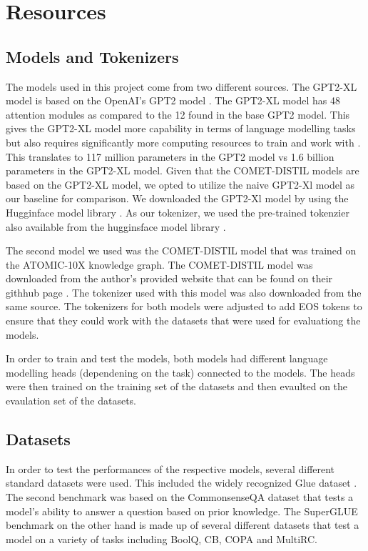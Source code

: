 \documentclass[\main/thesis.tex]{subfiles}
\begin{document}
\chapter{Resources}\label{sec:resources} 


\section{Models and Tokenizers}\label{sec:models}
The models used in this project come from two different sources. The GPT2-XL model is based on the OpenAI's GPT2 model 
\cite{radford_language_nodate}. The GPT2-XL model has 48 attention modules as compared to the 12 found in the base 
GPT2 model. This gives the GPT2-XL model more capability in terms of language modelling tasks but also requires 
significantly more computing resources to train and work with \cite{noauthor_pretrained_nodate}. This translates to 117 
million parameters in the GPT2 model vs 1.6 billion parameters in the GPT2-XL model. Given that the COMET-DISTIL models
are based on the GPT2-XL model, we opted to utilize the naive GPT2-Xl model as our baseline for comparison. We 
downloaded the GPT2-Xl model by using the Hugginface model library \cite{noauthor_gpt2-xl_nodate}. As our tokenizer, we 
used the pre-trained tokenzier also available from the hugginsface model library \cite{noauthor_gpt2-xl_nodate}. 

The second model we used was the COMET-DISTIL model \cite{west_symbolic_2021} that was trained on the ATOMIC-10X 
knowledge graph. The COMET-DISTIL model was downloaded from the author's provided website that can be found on their 
githhub page \cite{peterwestai2_symbolic_2022}. The tokenizer used with this model was also downloaded from the same 
source. The tokenizers for both models were adjusted to add EOS tokens to ensure that they could work with the datasets 
that were used for evaluationg the models. 

In order to train and test the models, both models had different language modelling heads (dependening on the task) 
connected to the models. The heads were then trained on the training set of the datasets and then evaulted on 
the evaulation set of the datasets. 

\section{Datasets}\label{sec:datasets}
In order to test the performances of the respective models, several different standard datasets were used. This 
included the widely recognized Glue dataset \cite{}. The second benchmark was based on the 
CommonsenseQA dataset \cite{talmor_commonsenseqa_2018} that tests a model's ability to answer a question based on prior 
knowledge. The SuperGLUE benchmark on the other hand is made up of several different datasets that test a model on a 
variety of tasks including BoolQ, CB, COPA and MultiRC. 
\end{document}
